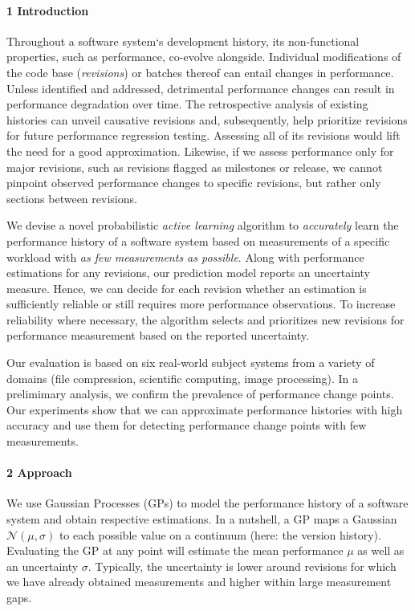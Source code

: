 \documentclass[english]{lni}
\begin{document}

\paragraph{1 Introduction} Throughout a software system‘s development history, its non-functional properties, such as performance, co-evolve alongside. Individual modifications of the code base (\emph{revisions}) or batches thereof can entail changes in performance.
Unless identified and addressed, detrimental performance changes can result in performance degradation over time. 
The retrospective analysis of existing histories can unveil causative revisions and, subsequently, help prioritize revisions for future performance regression testing. 
Assessing all of its revisions would lift the need for a good approximation. Likewise, if we assess performance only for major revisions, such as revisions flagged as milestones or release, we cannot pinpoint observed performance changes to specific revisions, but rather only sections between revisions.

We devise a novel probabilistic \emph{active learning} algorithm to \emph{accurately} learn the performance history of a software system based on measurements of a specific workload with \emph{as few measurements as possible}. Along with performance estimations for any revisions, our prediction model reports an uncertainty measure. Hence, we can decide for each revision whether an estimation is sufficiently reliable or still requires more performance observations. To increase reliability where necessary, the algorithm selects and prioritizes new revisions for performance measurement based on the reported uncertainty.


Our evaluation is based on six real-world subject systems from a variety of domains (file compression, scientific computing, image processing). In a prelimimary analysis, we confirm the prevalence of performance change points. Our experiments show that we can approximate performance histories with high accuracy and use them for detecting performance change points with few measurements. 

\paragraph{2 Approach} We use Gaussian Processes (GPs) to model the performance history of a software system and obtain respective estimations. In a nutshell, a GP maps a Gaussian $\mathcal{N}(\mu, \sigma)$ to each possible value on a continuum (here: the version history). Evaluating the GP at any point will estimate the mean performance $\mu$ as well as an uncertainty $\sigma$. Typically, the uncertainty is lower around revisions for which we have already obtained measurements and higher within large measurement gaps. 
\end{document}
